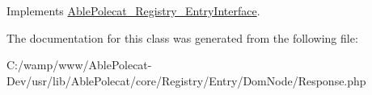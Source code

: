 Implements \hyperlink{interface_able_polecat___registry___entry_interface_afc8a3c62679cf00ade9f15fb2a6d6132}{Able\+Polecat\+\_\+\+Registry\+\_\+\+Entry\+Interface}.



The documentation for this class was generated from the following file\+:\begin{DoxyCompactItemize}
\item 
C\+:/wamp/www/\+Able\+Polecat-\/\+Dev/usr/lib/\+Able\+Polecat/core/\+Registry/\+Entry/\+Dom\+Node/Response.\+php\end{DoxyCompactItemize}
